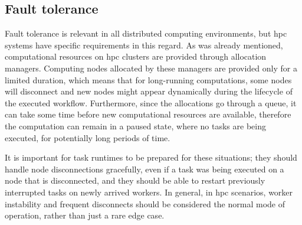 \subsection{Fault tolerance}
Fault tolerance is relevant in all distributed computing environments, but
\gls{hpc} systems have specific requirements in this regard. As was already
mentioned, computational resources on \gls{hpc} clusters are provided through
allocation managers. Computing nodes allocated by these managers are provided only for a limited
duration, which means that for long-running computations, some nodes will disconnect and new nodes
might appear dynamically during the lifecycle of the executed workflow. Furthermore, since the
allocations go through a queue, it can take some time before new computational resources are
available, therefore the computation can remain in a paused state, where no tasks are being
executed, for potentially long periods of time.

It is important for task runtimes to be prepared for these situations; they should handle node
disconnections gracefully, even if a task was being executed on a node that is disconnected, and
they should be able to restart previously interrupted tasks on newly arrived workers. In general,
in \gls{hpc} scenarios, worker instability and frequent disconnects should be
considered the normal mode of operation, rather than just a rare edge case.

